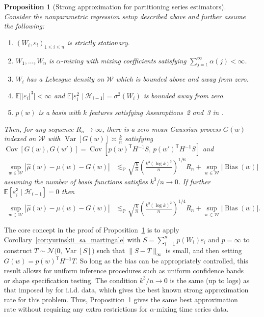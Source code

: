 \documentclass[11pt,lof]{puthesis}
\renewcommand{\P}{\ensuremath{\mathbb{P}}}
\newcommand{\E}{\ensuremath{\mathbb{E}}}
\newcommand{\cH}{\ensuremath{\mathcal{H}}}
\newcommand{\cN}{\ensuremath{\mathcal{N}}}
\newcommand{\cW}{\ensuremath{\mathcal{W}}}
\newcommand{\T}{\ensuremath{\mathsf{T}}}
\DeclareMathOperator{\Var}{Var}
\DeclareMathOperator{\Cov}{Cov}
\DeclareMathOperator{\Bias}{Bias}
\theoremstyle{break}
\newtheorem{proposition}{Proposition}[section]
\theoremstyle{proof}
\begin{document}
\begin{proposition}[Strong approximation for partitioning series estimators]%
\label{pro:yurinskii_series}
%
Consider the nonparametric regression setup described above
and further assume the following:
%
\begin{enumerate}[label=(\roman*)]

\item
$(W_i, \varepsilon_i)_{1 \leq i \leq n}$
is strictly stationary.

\item
$W_1, \ldots, W_n$ is $\alpha$-mixing with mixing coefficients
satisfying $\sum_{j=1}^\infty \alpha(j) < \infty$.

\item
$W_i$ has a Lebesgue density on $\cW$
which is bounded above and away from zero.

\item
$\E\big[|\varepsilon_i|^3 \big] < \infty$
and
$\E\big[\varepsilon_i^2 \mid \cH_{i-1}\big]=\sigma^2(W_i)$
is bounded away from zero.

\item
$p(w)$ is a basis with $k$ features satisfying
Assumptions~2 and~3 in \citet{cattaneo2020large}.

\end{enumerate}
%
Then, for any sequence $R_n \to \infty$,
there is a zero-mean Gaussian process
$G(w)$ indexed on $\cW$
with $\Var[G(w)] \asymp\frac{k}{n}$
satisfying
$\Cov[G(w), G(w')]
= \Cov[p(w)^\T H^{-1} S,\, p(w')^\T H^{-1} S]$
and
%
\begin{align*}
\sup_{w \in \cW}
\left| \hat\mu(w) - \mu(w) - G(w) \right|
&\lesssim_\P
\sqrt{\frac{k}{n}}
\left( \frac{k^3 (\log k)^3}{n} \right)^{1/6} R_n
+ \sup_{w \in \cW} |\Bias(w)|
\end{align*}
%
assuming the number of basis functions satisfies $k^3 / n \to 0$.
If further $\E \left[ \varepsilon_i^3 \mid \cH_{i-1} \right] = 0$ then
%
\begin{align*}
\sup_{w \in \cW}
\left| \hat\mu(w) - \mu(w) - G(w) \right|
&\lesssim_\P
\sqrt{\frac{k}{n}}
\left( \frac{k^3 (\log k)^2}{n} \right)^{1/4} R_n
+ \sup_{w \in \cW} |\Bias(w)|.
\end{align*}
%
\end{proposition}

The core concept in the proof of Proposition~\ref{pro:yurinskii_series} is to
apply
Corollary~\ref{cor:yurinskii_sa_martingale} with
$S = \sum_{i=1}^n p(W_i) \varepsilon_i$
and $p=\infty$ to construct $T \sim \cN\big(0, \Var[S]\big)$ such that
$\|S - T \|_\infty$ is small, and then setting $G(w) = p(w)^\T H^{-1} T$. So
long as the bias can be appropriately controlled, this result allows for
uniform inference procedures such as uniform confidence bands or shape
specification testing. The condition $k^3 / n \to 0$ is the same (up to logs)
as that imposed by \citet{cattaneo2020large} for i.i.d. data, which gives the
best known strong approximation rate for this problem. Thus,
Proposition~\ref{pro:yurinskii_series} gives the same best approximation rate
without
requiring any extra restrictions for $\alpha$-mixing time series data.
\end{document}
